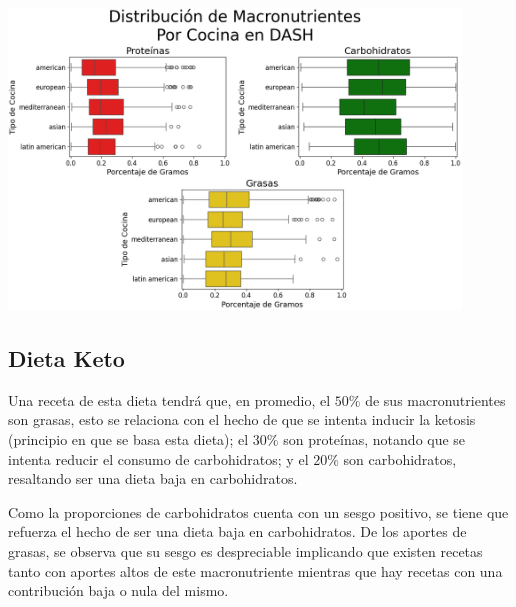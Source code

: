 \documentclass[12pt,a4paper]{article}
\begin{document}
{{{            \begin{center}
                \includegraphics[width=0.9\textwidth]{Resources/EDA/Dash_2.png}
            \end{center}
            }

            \subsection{Dieta Keto}\label{anexo:C_keto}
            {
            Una receta de esta dieta tendrá que, en promedio, el $50\%$ de 
            sus macronutrientes son grasas, esto se relaciona con el hecho de 
            que se intenta inducir la ketosis (principio en que se basa esta         
            dieta); el $30\%$ son proteínas, notando que se intenta reducir 
            el consumo de carbohidratos; y el $20\%$ son carbohidratos, 
            resaltando ser una dieta baja en carbohidratos.\newline 
            
            Como la proporciones de carbohidratos cuenta con un sesgo positivo, se 
            tiene que refuerza el hecho de ser una dieta baja en carbohidratos. 
            De los aportes de grasas, se observa que su sesgo es despreciable 
            implicando que existen recetas tanto con aportes altos de este 
            macronutriente mientras que hay recetas con 
            una contribución baja o nula del mismo.
        
}}}
\end{document}
